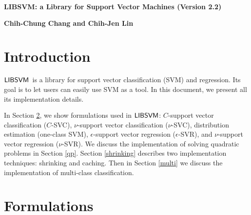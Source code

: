 \documentclass[11pt]{article}
\newcommand{\libsvm}{$\mbox{{\sf LIBSVM}}$}
\renewcommand{\thefootnote}{\fnsymbol{footnote}}
\theoremstyle{break}
\begin{document}
\setlength{\baselineskip}{18pt}
\renewcommand{\thefootnote}{\fnsymbol{footnote}}    

\begin{center}
{\Large\bf LIBSVM: a Library for Support 
Vector Machines (Version 2.2)}

\bigskip

{\bf Chih-Chung Chang and
 Chih-Jen Lin\footnotemark[1]}

\end{center}

\begin{abstract}
\libsvm\ is a library
for support 
vector machines (SVM).
Its goal is to help users can
easily use SVM as a tool.
In this document, we present all 
its implementation details.
\end{abstract}


\section{Introduction}

\libsvm\ is a library
for support 
vector classification (SVM) and regression.
Its goal is to let users can
easily use SVM as a tool.
In this document, we present all 
its implementation details.

In Section \ref{formulation},
we show formulations used in 
\libsvm:
$C$-support vector classification
($C$-SVC),
$\nu$-support vector classification
 ($\nu$-SVC),
distribution estimation (one-class SVM),
$\epsilon$-support vector regression ($\epsilon$-SVR),
and
$\nu$-support vector regression ($\nu$-SVR).
We discuss the implementation 
of solving quadratic problems in Section 
\ref{qp}. 
Section \ref{shrinking}
describes two implementation techniques:
shrinking and caching.
Then in Section \ref{multi}
we discuss the implementation of
multi-class classification.

\section{Formulations}
\label{formulation}
\end{document}
